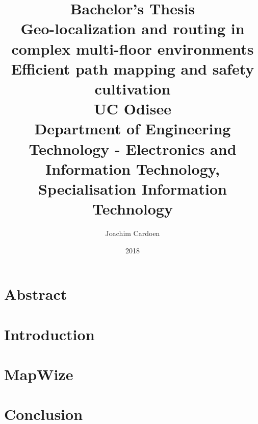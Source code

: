 \documentclass[12pt, twoside]{report}
\title{
    {\large Bachelor's Thesis}\\
    {Geo-localization and routing in complex multi-floor environments}\\
    {Efficient path mapping and safety cultivation}\\
    {\large UC Odisee}\\
    {\large Department of Engineering Technology - Electronics and Information Technology, Specialisation Information Technology}
}
\author{Joachim Cardoen}
\date{2018}
\begin{document}
\maketitle

\chapter*{Abstract}


\tableofcontents

\chapter{Introduction}


\chapter{MapWize}


\chapter{Conclusion}


\appendix
\chapter{}


\newpage
\printbibliography
\end{document}

